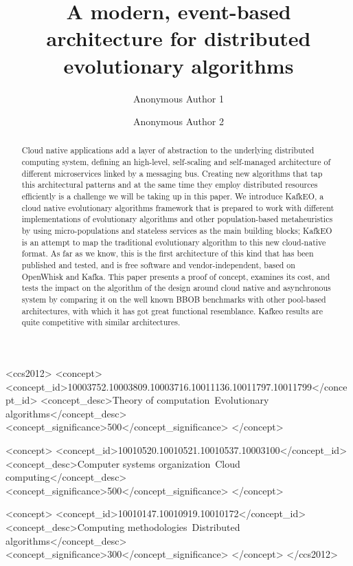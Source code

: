 \documentclass[sigconf]{acmart}
\begin{document}
\title{A modern, event-based architecture for distributed evolutionary algorithms}

\author{Anonymous Author 1}

\author{Anonymous Author 2}

\renewcommand{\shortauthors}{A. Author et al.}


\begin{abstract}
   Cloud native applications add a layer of abstraction to the
underlying distributed computing system, defining an high-level,
self-scaling and self-managed architecture of different microservices
linked by a messaging bus. Creating new algorithms that tap this
architectural patterns and at the same time they employ distributed
resources efficiently is a challenge we will be taking up in this
paper. We introduce KafkEO, a cloud native evolutionary algorithms
framework that is prepared to work with different implementations of evolutionary
algorithms and other population-based metaheuristics by using
micro-populations and stateless services as the main building
blocks; KafkEO is an attempt to map the traditional evolutionary
algorithm to this new cloud-native format. As far as we know, this is the first
architecture of this kind that has been published and tested, and is free software and vendor-independent, based on OpenWhisk and Kafka. This paper presents a proof of concept, examines its cost, and tests the impact on the algorithm of the design around
cloud native and asynchronous system by comparing it on
the well known BBOB benchmarks with other pool-based architectures,
with which it has got great functional resemblance. Kafkeo results are quite competitive with  similar architectures.
\end{abstract}

\begin{CCSXML}
<ccs2012>
<concept>
<concept_id>10003752.10003809.10003716.10011136.10011797.10011799</concept_id>
<concept_desc>Theory of computation~Evolutionary algorithms</concept_desc>
<concept_significance>500</concept_significance>
</concept>

<concept>
<concept_id>10010520.10010521.10010537.10003100</concept_id>
<concept_desc>Computer systems organization~Cloud computing</concept_desc>
<concept_significance>500</concept_significance>
</concept>

<concept>
<concept_id>10010147.10010919.10010172</concept_id>
<concept_desc>Computing methodologies~Distributed algorithms</concept_desc>
<concept_significance>300</concept_significance>
</concept>
</ccs2012>
\end{CCSXML}
\end{document}
